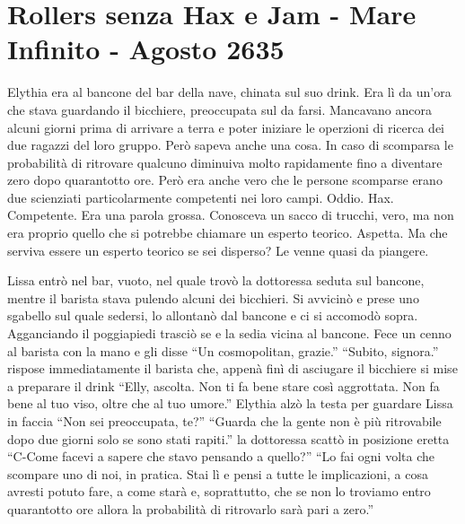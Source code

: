   \section{Rollers senza Hax e Jam - Mare Infinito - Agosto 2635}

    Elythia era al bancone del bar della nave, chinata sul suo drink. Era
    lì da un'ora che stava guardando il bicchiere, preoccupata sul da
    farsi. Mancavano ancora alcuni giorni prima di arrivare a terra e poter
    iniziare le operzioni di ricerca dei due ragazzi del loro gruppo. Però
    sapeva anche una cosa. In caso di scomparsa le probabilità di ritrovare
    qualcuno diminuiva molto rapidamente fino a diventare zero dopo
    quarantotto ore. Però era anche vero che le persone scomparse erano due
    scienziati particolarmente competenti nei loro campi. Oddio. Hax.
    Competente. Era una parola grossa. Conosceva un sacco di trucchi, vero,
    ma non era proprio quello che si potrebbe chiamare un esperto teorico.
    Aspetta. Ma che serviva essere un esperto teorico se sei disperso? Le
    venne quasi da piangere.

    Lissa entrò nel bar, vuoto, nel quale trovò la dottoressa seduta sul
    bancone, mentre il barista stava pulendo alcuni dei bicchieri. Si
    avvicinò e prese uno sgabello sul quale sedersi, lo allontanò dal
    bancone e ci si accomodò sopra. Agganciando il poggiapiedi trasciò se e
    la sedia vicina al bancone. Fece un cenno al barista con la mano e gli
    disse ``Un cosmopolitan, grazie.'' ``Subito, signora.'' rispose
    immediatamente il barista che, appenà finì di asciugare il bicchiere si
    mise a preparare il drink ``Elly, ascolta. Non ti fa bene stare così
    aggrottata. Non fa bene al tuo viso, oltre che al tuo umore.'' Elythia
    alzò la testa per guardare Lissa in faccia ``Non sei preoccupata, te?''
    ``Guarda che la gente non è più ritrovabile dopo due giorni solo se
    sono stati rapiti.'' la dottoressa scattò in posizione eretta ``C-Come
    facevi a sapere che stavo pensando a quello?'' ``Lo fai ogni volta che
    scompare uno di noi, in pratica. Stai lì e pensi a tutte le
    implicazioni, a cosa avresti potuto fare, a come starà e,
    soprattutto, che se non lo troviamo entro quarantotto ore allora la
    probabilità di ritrovarlo sarà pari a zero.''

